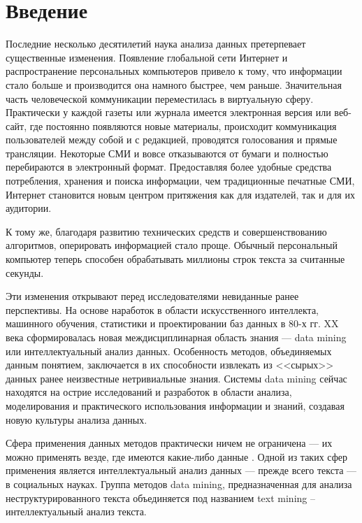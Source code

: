 \chapter*{Введение}							%

Последние несколько десятилетий наука анализа данных претерпевает существенные изменения. Появление глобальной сети Интернет и распространение персональных компьютеров привело к тому, что информации стало больше и производится она намного быстрее, чем раньше. Значительная часть человеческой коммуникации переместилась в виртуальную сферу. Практически у каждой газеты или журнала имеется электронная версия или веб-сайт, где постоянно появляются новые материалы, происходит коммуникация пользователей между собой и с редакцией, проводятся голосования и прямые трансляции. Некоторые СМИ и вовсе отказываются от бумаги и полностью перебираются в электронный формат. Предоставляя более удобные средства потребления, хранения и поиска информации, чем традиционные печатные СМИ, Интернет становится новым центром притяжения как для издателей, так и для их аудитории.

К тому же, благодаря развитию технических средств и совершенствованию алгоритмов, оперировать информацией стало проще. Обычный персональный компьютер теперь способен обрабатывать миллионы строк текста за считанные секунды.

Эти изменения открывают перед исследователями невиданные ранее перспективы. На основе наработок в области искусственного интеллекта, машинного обучения, статистики и проектировании баз данных в 80-х гг. XX века сформировалась новая междисциплинарная область знания --- data mining или интеллектуальный анализ данных. Особенность методов, объединяемых данным понятием, заключается в их способности извлекать из <<сырых>> данных ранее неизвестные нетривиальные знания. Системы data mining сейчас находятся на острие исследований и разработок в области анализа, моделирования и практического использования информации и знаний, создавая новую культуры анализа данных.

Сфера применения данных методов практически ничем не ограничена --- их можно применять везде, где имеются какие-либо данные \cite[стр. 81]{Duk2011}. Одной из таких сфер применения является интеллектуальный анализ данных --- прежде всего текста --- в социальных науках. Группа методов data mining, предназначенная для анализа неструктурированного текста объединяется под названием text mining -- интеллектуальный анализ текста.

